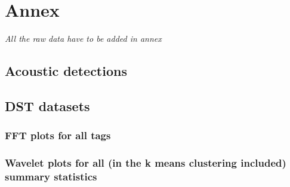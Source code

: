 \documentclass[
  authoryear,
  review,
  3p]{elsarticle}
\begin{document}
\hypertarget{annex}{%
\section{Annex}\label{annex}}

\emph{All the raw data have to be added in annex}

\hypertarget{acoustic-detections-2}{%
\subsection{Acoustic detections}\label{acoustic-detections-2}}

\hypertarget{dst-datasets}{%
\subsection{DST datasets}\label{dst-datasets}}

\hypertarget{fft-plots-for-all-tags}{%
\subsubsection{FFT plots for all tags}\label{fft-plots-for-all-tags}}

\hypertarget{wavelet-plots-for-all-in-the-k-means-clustering-included-summary-statistics}{%
\subsubsection{Wavelet plots for all (in the k means clustering
included) summary
statistics}\label{wavelet-plots-for-all-in-the-k-means-clustering-included-summary-statistics}}


  
\end{document}
